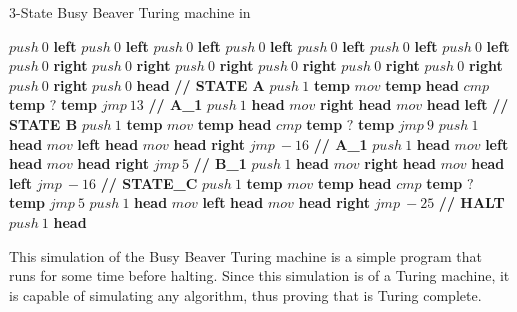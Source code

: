 \begin{algorithm}
    \caption{3-State Busy Beaver Turing machine in \sculpt}
    \label{alg:busybeaver}
    \begin{algorithmic}
    \State $push~0$ \textbf{left}
    \State $push~0$ \textbf{left}
    \State $push~0$ \textbf{left}
    \State $push~0$ \textbf{left}
    \State $push~0$ \textbf{left}
    \State $push~0$ \textbf{left}
    \State $push~0$ \textbf{left}
    \State
    \State $push~0$ \textbf{right}
    \State $push~0$ \textbf{right}
    \State $push~0$ \textbf{right}
    \State $push~0$ \textbf{right}
    \State $push~0$ \textbf{right}
    \State $push~0$ \textbf{right}
    \State $push~0$ \textbf{right}
    \State
    \State $push~0$ \textbf{head}
    \State
    \State \textbf{// STATE A}
    \State $push~1$ \textbf{temp}
    \State $mov$ \textbf{temp} \textbf{head}
    \State $cmp$ \textbf{temp}
    \State $?$ \textbf{temp}
    \State $jmp~13$ \textbf{// A\_1}
    \State $push~1$ \textbf{head}
    \State $mov$ \textbf{right} \textbf{head}
    \State $mov$ \textbf{head} \textbf{left}
    \State
    \State \textbf{// STATE B}
    \State $push~1$ \textbf{temp}
    \State $mov$ \textbf{temp} \textbf{head}
    \State $cmp$ \textbf{temp}
    \State $?$ \textbf{temp}
    \State $jmp~9$
    \State $push~1$ \textbf{head}
    \State $mov$ \textbf{left} \textbf{head}
    \State $mov$ \textbf{head} \textbf{right}
    \State $jmp~-16$
    \State
    \State \textbf{// A\_1}
    \State $push~1$ \textbf{head}
    \State $mov$ \textbf{left} \textbf{head}
    \State $mov$ \textbf{head} \textbf{right}
    \State $jmp~5$
    \State
    \State \textbf{// B\_1}
    \State $push~1$ \textbf{head}
    \State $mov$ \textbf{right} \textbf{head}
    \State $mov$ \textbf{head} \textbf{left}
    \State $jmp~-16$
    \State
    \State \textbf{// STATE\_C}
    \State $push~1$ \textbf{temp}
    \State $mov$ \textbf{temp} \textbf{head}
    \State $cmp$ \textbf{temp}
    \State $?$ \textbf{temp}
    \State $jmp~5$
    \State $push~1$ \textbf{head}
    \State $mov$ \textbf{left} \textbf{head}
    \State $mov$ \textbf{head} \textbf{right}
    \State $jmp~-25$
    \State
    \State \textbf{// HALT}
    \State $push~1$ \textbf{head}
    \end{algorithmic}
\end{algorithm}

This simulation of the Busy Beaver Turing machine is a simple program that runs for some time before halting.
Since this simulation is of a Turing machine, it is capable of simulating any algorithm, thus proving that \sculpt is Turing complete.


